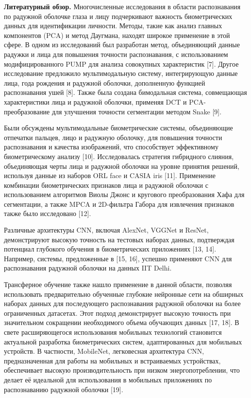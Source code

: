 \begin{multicols}{2}
{\bfseries Литературный обзор.} Многочисленные исследования в области
распознавания по радужной оболочке глаза и лицу подчеркивают важность
биометрических данных для идентификации личности. Методы, такие как
анализ главных компонентов (PCA) и метод Даугмана, находят широкое
применение в этой сфере. В одном из исследований был разработан метод,
объединяющий данные радужки и лица для повышения точности распознавания,
с использованием модифицированного PUMP для анализа совокупных
характеристик {[}7{]}. Другое исследование предложило мультимодальную
систему, интегрирующую данные лица, года рождения и радужной оболочки,
дополненную функцией распознавания ушей {[}8{]}. Также была создана
бимодальная система, совмещающая характеристики лица и радужной
оболочки, применяя DCT и PCA-преобразование для улучшения точности
сегментации методом Snake {[}9{]}.

Были обсуждены мультимодальные биометрические системы, объединяющие
отпечатки пальцев, лицо и радужную оболочку, для повышения точности
распознавания и качества изображений, что способствует эффективному
биометрическому анализу {[}10{]}. Исследовалась стратегия гибридного
слияния, объединяющая черты лица и радужной оболочки на уровне принятия
решений, используя данные из наборов ORL face и CASIA iris {[}11{]}.
Применение комбинации биометрических признаков лица и радужной оболочки
с использованием алгоритмов Виолы Джонс и кругового преобразования Хафа
для сегментации, а также MPCA и 2D-фильтра Габора для извлечения
признаков также было исследовано {[}12{]}.

Различные архитектуры CNN, включая AlexNet, VGGNet и ResNet,
демонстрируют высокую точность на тестовых наборах данных, подтверждая
потенциал глубокого обучения в биометрических приложениях {[}13, 14{]}.
Например, системы, предложенные в {[}15, 16{]}, успешно применяют CNN
для распознавания радужной оболочки на данных IIT Delhi.

Трансферное обучение также нашло применение в данной области, позволяя
использовать предварительно обученные глубокие нейронные сети на
обширных наборах данных для последующего распознавания радужной оболочки
на более ограниченных датасетах. Этот подход демонстрирует высокую
точность при значительном сокращении необходимого объема обучающих
данных {[}17, 18{]}. В свете расширяющегося использования мобильных
технологий становится актуальной разработка биометрических систем,
адаптированных для мобильных устройств. В частности, MobileNet,
легковесная архитектура CNN, предназначенная для работы на мобильных и
встраиваемых устройствах, обеспечивает высокую производительность при
низком энергопотреблении, что делает её идеальной для использования в
мобильных приложениях по распознаванию радужной оболочки {[}19{]}.


\end{multicols}
